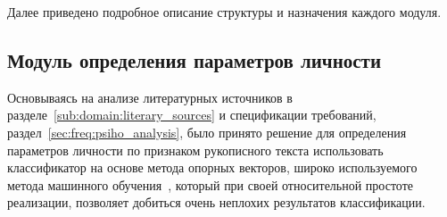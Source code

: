 Далее приведено подробное описание структуры и назначения каждого модуля.

\subsection{Модуль определения параметров личности}
\label{sec:architecture:personal_parameters}
Основываясь на анализе литературных источников в разделе~\ref{sub:domain:literary_sources} и спецификации требований, раздел~\ref{sec:freq:psiho_analysis}, было принято решение для определения параметров личности по признаком рукописного текста использовать классификатор на основе метода опорных векторов, широко используемого метода машинного обучения~\cite{manning_ir}, который при своей относительной простоте реализации, позволяет добиться очень неплохих результатов классификации.

